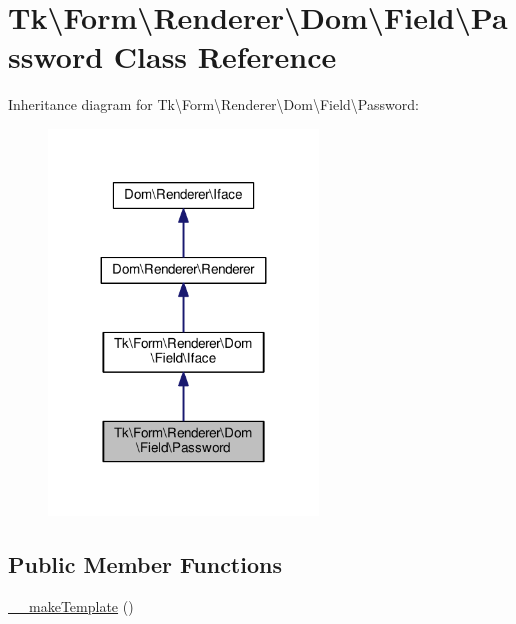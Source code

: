 \hypertarget{classTk_1_1Form_1_1Renderer_1_1Dom_1_1Field_1_1Password}{\section{Tk\textbackslash{}Form\textbackslash{}Renderer\textbackslash{}Dom\textbackslash{}Field\textbackslash{}Password Class Reference}
\label{classTk_1_1Form_1_1Renderer_1_1Dom_1_1Field_1_1Password}
}


Inheritance diagram for Tk\textbackslash{}Form\textbackslash{}Renderer\textbackslash{}Dom\textbackslash{}Field\textbackslash{}Password\+:\nopagebreak
\begin{figure}[H]
\begin{center}
\leavevmode
\includegraphics[width=203pt]{classTk_1_1Form_1_1Renderer_1_1Dom_1_1Field_1_1Password__inherit__graph}
\end{center}
\end{figure}
\subsection*{Public Member Functions}
\begin{DoxyCompactItemize}
\item 
\hyperlink{classTk_1_1Form_1_1Renderer_1_1Dom_1_1Field_1_1Password_a052de90c4fd6be7c9e4ef8ba9fade4fa}{\+\_\+\+\_\+make\+Template} ()
\end{DoxyCompactItemize}
